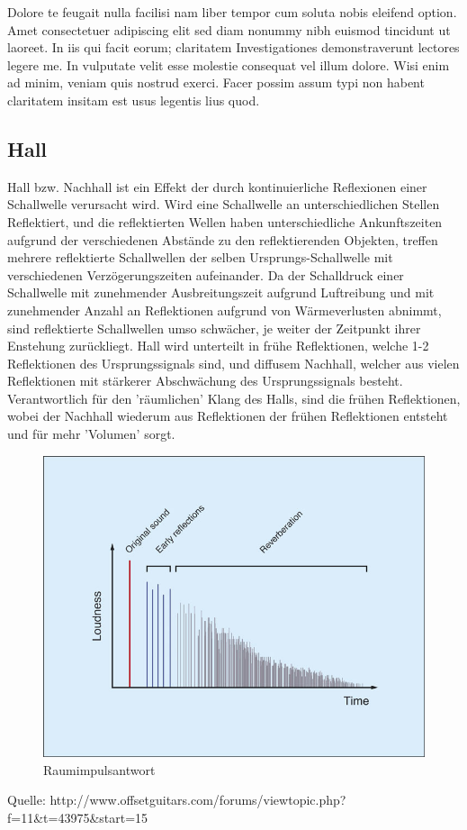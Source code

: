 \documentclass[a4paper,12pt,fontsize=12,DIV=12]{scrartcl}
\begin{document}
Dolore te feugait nulla facilisi nam liber tempor cum soluta nobis eleifend option. Amet consectetuer adipiscing elit sed diam nonummy nibh euismod tincidunt ut laoreet. In iis qui facit eorum; claritatem Investigationes demonstraverunt lectores legere me. In vulputate velit esse molestie consequat vel illum dolore. Wisi enim ad minim, veniam quis nostrud exerci. Facer possim assum typi non habent claritatem insitam est usus legentis lius quod.

\subsection{Hall}
Hall bzw. Nachhall ist ein Effekt der durch kontinuierliche Reflexionen einer Schallwelle verursacht wird.
Wird eine Schallwelle an unterschiedlichen Stellen Reflektiert, und die reflektierten Wellen haben unterschiedliche Ankunftszeiten aufgrund der verschiedenen Abstände zu den reflektierenden Objekten, treffen mehrere reflektierte Schallwellen der selben Ursprungs-Schallwelle mit verschiedenen Verzögerungszeiten aufeinander. Da der Schalldruck einer Schallwelle mit zunehmender Ausbreitungszeit aufgrund Luftreibung und mit zunehmender Anzahl an Reflektionen aufgrund von Wärmeverlusten abnimmt, sind reflektierte Schallwellen umso schwächer, je weiter der Zeitpunkt ihrer Enstehung zurückliegt.
Hall wird unterteilt in frühe Reflektionen, welche 1-2 Reflektionen des Ursprungssignals sind, und diffusem Nachhall, welcher aus vielen Reflektionen mit stärkerer Abschwächung des Ursprungssignals besteht. Verantwortlich für den 'räumlichen' Klang des Halls, sind die frühen Reflektionen, wobei der Nachhall wiederum aus Reflektionen der frühen Reflektionen entsteht und für mehr 'Volumen' sorgt.


\begin{figure}[h]
	\includegraphics[scale=0.5]{Bilder/raumimpulsantwort.jpg}
	\caption{Raumimpulsantwort}
	\label{labelname}
\end{figure}
Quelle: http://www.offsetguitars.com/forums/viewtopic.php?f=11\&t=43975\&start=15
\end{document}
